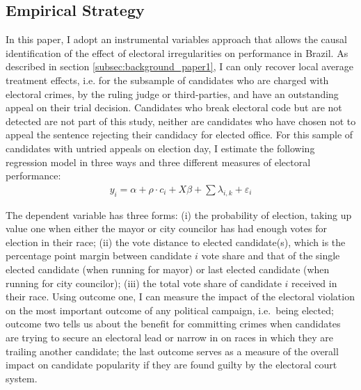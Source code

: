 \documentclass[11pt]{article}
\begin{document}
\subsection{Empirical Strategy} \label{subsec:methods_paper1}

In this paper, I adopt an instrumental variables approach that allows the causal identification of the effect of electoral irregularities on performance in Brazil. As described in section \ref{subsec:background_paper1}, I can only recover local average treatment effects, i.e. for the subsample of candidates who are charged with electoral crimes, by the ruling judge or third-parties, and have an outstanding appeal on their trial decision. Candidates who break electoral code but are not detected are not part of this study, neither are candidates who have chosen not to appeal the sentence rejecting their candidacy for elected office. For this sample of candidates with untried appeals on election day, I estimate the following regression model in three ways and three different measures of electoral performance:
\begin{equation} \label{eq:reg1}
  \begin{split}
    y_{i} = \alpha + \rho \cdot c_{i} + X\beta + \sum \lambda_{i, k} + \varepsilon_{i}
  \end{split}
\end{equation}

The dependent variable has three forms: (i) the probability of election, taking up value one when either the mayor or city councilor has had enough votes for election in their race; (ii) the vote distance to elected candidate(s), which is the percentage point margin between candidate $i$ vote share and that of the single elected candidate (when running for mayor) or last elected candidate (when running for city councilor); (iii) the total vote share of candidate $i$ received in their race. Using outcome one, I can measure the impact of the electoral violation on the most important outcome of any political campaign, i.e.~being elected; outcome two tells us about the benefit for committing crimes when candidates are trying to secure an electoral lead or narrow in on races in which they are trailing another candidate; the last outcome serves as a measure of the overall impact on candidate popularity if they are found guilty by the electoral court system.
\end{document}

